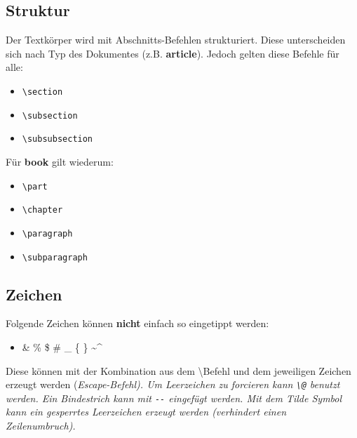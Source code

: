 \documentclass[10pt]{scrartcl}  %
\begin{document}
    \subsection{Struktur}
        Der Textkörper wird mit Abschnitts-Befehlen strukturiert. Diese unterscheiden sich nach Typ des Dokumentes (z.B. \textbf{article}). Jedoch gelten diese Befehle für alle:
        \begin{itemize}
            \item \verb!\section!
            \item \verb!\subsection!
            \item \verb!\subsubsection!
        \end{itemize}
        Für \textbf{book} gilt wiederum:
        \begin{itemize}
            \item \verb!\part!
            \item \verb!\chapter!
            \item \verb!\paragraph!
            \item \verb!\subparagraph!
        \end{itemize}
    \subsection{Zeichen}
        Folgende Zeichen können \textbf{nicht} einfach so eingetippt werden:
        \begin{itemize}
            \item \& \@ \% \@ \$ \@ \# \@ \_ \@ \{ \@ \} \@ \~ \@ \^ \@
        \end{itemize}
        Diese können mit der Kombination aus dem \textbackslash \@ Befehl und dem jeweiligen Zeichen erzeugt werden (\em Escape-Befehl\normalfont).  %
        Um Leerzeichen zu forcieren kann \verb!\@! benutzt werden. Ein Bindestrich kann mit \verb!--! eingefügt werden. Mit dem Tilde Symbol kann ein gesperrtes Leerzeichen erzeugt werden (verhindert einen Zeilenumbruch).
\end{document}

